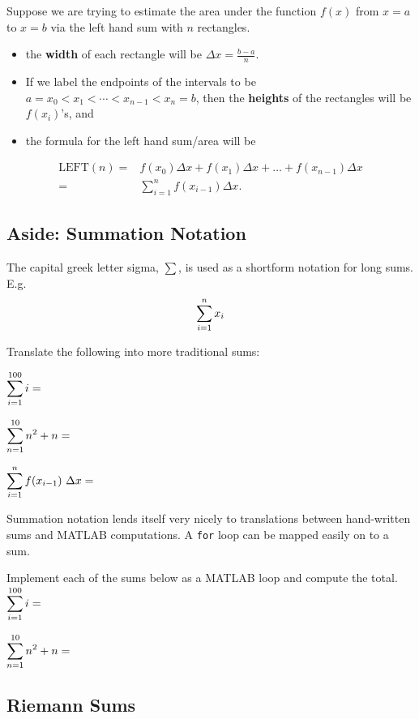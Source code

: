 Suppose we are trying to estimate the area under the function $f(x)$
from $x = a$ to $x = b$ via the left hand sum with $n$ rectangles.
\begin{itemize}
\item the {\bf width} of each rectangle will be $\Delta x =
\displaystyle\frac{b-a}{n}$.  
\item If we label the endpoints of the
intervals to be $a = x_{0} < x_{1} < \cdots < x_{n-1} < x_{n} = b$,
then the {\bf heights} of the rectangles will be $f(x_{i})$'s, and
\item the formula for the left hand sum/area will be
\end{itemize}

\begin{align*}
  \mbox{LEFT}(n) = & f(x_{0}) \Delta x+ 
 f(x_{1}) \Delta x + \ldots + 
 f(x_{n-1}) \Delta x 
\\  = & \displaystyle\sum_{i=1}^{n} f(x_{i-1})\Delta x.
\end{align*}

\newpage

\subsection*{Aside: Summation Notation}

The capital greek letter sigma, $\sum$, is used as a shortform notation for long sums.
E.g.
$$\displaystyle \sum_{i=1}^n x_i$$

\newpage
\problem 
Translate the following into more traditional sums:

$\displaystyle \sum_{i=1}^{100} i= $ \vfill 

$\displaystyle \sum_{n=1}^{10} n^2 + n= $  \vfill

$\displaystyle \sum_{i=1}^{n}  f(x_{i-1}) ~\Delta x= $
\vfill

\newpage 

Summation notation lends itself very nicely to translations between
hand-written sums and MATLAB computations.  A \texttt{for} loop can be
mapped easily on to a sum.

\problem Implement each of the sums below as a MATLAB loop and compute
the total. \\

$\displaystyle \sum_{i=1}^{100} i= $ \vfill 

$\displaystyle \sum_{n=1}^{10} n^2 + n= $  \vfill

\newpage


\subsection*{Riemann Sums}

